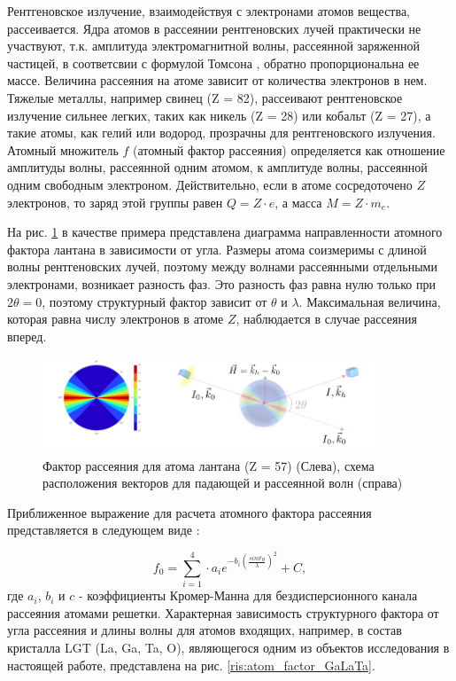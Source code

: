 
Рентгеновское излучение, взаимодействуя с электронами атомов вещества, рассеивается.
Ядра атомов в рассеянии рентгеновских лучей практически не участвуют, т.к.
амплитуда электромагнитной волны, рассеянной заряженной частицей, в соответсвии с формулой
Томсона \cite{iveronova1972}, обратно пропорциональна ее массе. Величина рассеяния
на атоме зависит от количества электронов в нем. Тяжелые металлы,
 например свинец (Z = 82), рассеивают рентгеновское излучение сильнее легких,
 таких как никель (Z = 28) или  кобальт (Z = 27), а такие атомы, как гелий или водород, прозрачны
 для рентгеновского излучения.  Атомный множитель $f$ (атомный фактор рассеяния) определяется
как отношение амплитуды волны, рассеянной одним атомом, к амплитуде волны, рассеянной
одним свободным электроном. Действительно, если в атоме сосредоточено
$Z$ электронов, то заряд этой группы равен $Q = Z\cdot e$, а масса $M = Z \cdot m_e$.

На рис. \ref{ris:atom_factor} в качестве примера представлена диаграмма направленности атомного
фактора лантана в зависимости от угла. Размеры атома соизмеримы с длиной волны
рентгеновских лучей, поэтому между волнами рассеянными отдельными электронами, возникает
разность фаз. Это разность фаз равна нулю только при $2 \theta = 0$, поэтому структурный
фактор зависит от $\theta$ и $\lambda$. Максимальная величина, которая равна числу электронов в атоме $Z$,
 наблюдается в случае рассеяния вперед.

\begin{figure}[H]
  \centering
  \includegraphics[width=0.9\textwidth]{images/atom_factor.png}
  \caption{Фактор рассеяния для атома лантана (Z = 57) (Слева),
  схема расположения векторов для падающей и рассеянной волн (справа)}
  \label{ris:atom_factor}
\end{figure}

Приближенное выражение для расчета атомного фактора рассеяния
представляется в следующем виде \cite{International_Tables}:

\begin{equation}
  f_0 = \sum_{i=1}^{4} \cdot a_i e^{ -b_i (\frac{sin \vartheta_B}{\lambda})^2} + C,
 \end{equation}
где $a_i$, $b_i$ и $c$ - коэффициенты Кромер-Манна для бездисперсионного канала рассеяния атомами решетки.
Характерная зависимость структурного фактора от угла рассеяния и длины волны
для атомов входящих, например, в состав кристалла LGT (La, Ga, Ta, O), являющегося
одним из объектов исследования в настоящей работе, представлена на рис. \ref{ris:atom_factor_GaLaTa}.

